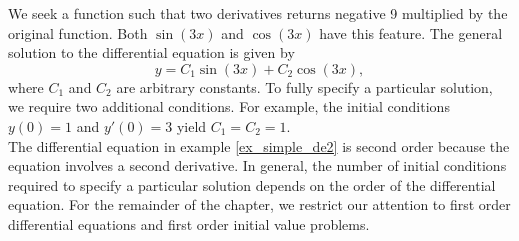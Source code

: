 {We seek a function such that two derivatives returns negative 9 multiplied by the original function.  Both $\sin(3x)$ and $\cos(3x)$ have this feature.  The general solution to the differential equation is given by
\[y = C_1\sin(3x) + C_2\cos(3x),\]
where $C_1$ and $C_2$ are arbitrary constants.  To fully specify a particular solution, we require two additional conditions.  For example, the initial conditions $y(0)=1$ and $y'(0)=3$ yield $C_1 = C_2 = 1.$}\\

The differential equation in example \ref{ex_simple_de2} is second order because the equation involves a second derivative.  In general, the number of initial conditions required to specify a particular solution depends on the order of the differential equation.  For the remainder of the chapter, we restrict our attention to first order differential equations and first order initial value problems.

